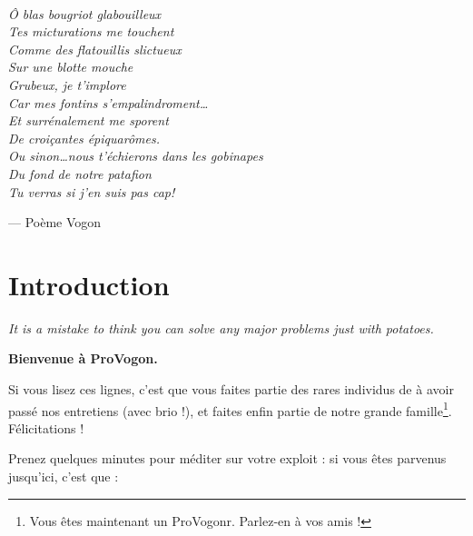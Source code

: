 \newpage ~

\vspace{5cm}

\noindent\emph{Ô blas bougriot glabouilleux\\
Tes micturations me touchent\\
Comme des flatouillis slictueux\\
Sur une blotte mouche\\
Grubeux, je t'implore\\
Car mes fontins s'empalindroment\ldots\\
Et surrénalement me sporent\\
De croiçantes épiquarômes.\\
Ou sinon\ldots nous t'échierons dans les gobinapes\\
Du fond de notre patafion\\
Tu verras si j'en suis pas cap!
}

\vspace{1cm}

\hspace{5cm} --- Poème Vogon

\newpage

\section{Introduction}

\emph{It is a mistake to think you can solve any major problems just with
potatoes.}


\vspace{1cm}

\textbf{Bienvenue à ProVogon.}

Si vous lisez ces lignes, c'est que vous faites partie des rares individus de à
avoir passé nos entretiens (avec brio !), et faites enfin partie de notre
grande famille\footnote{Vous êtes maintenant un ProVogonr. Parlez-en à vos
amis !}. Félicitations !

Prenez quelques minutes pour méditer sur votre exploit : si vous êtes parvenus
jusqu'ici, c'est que :

